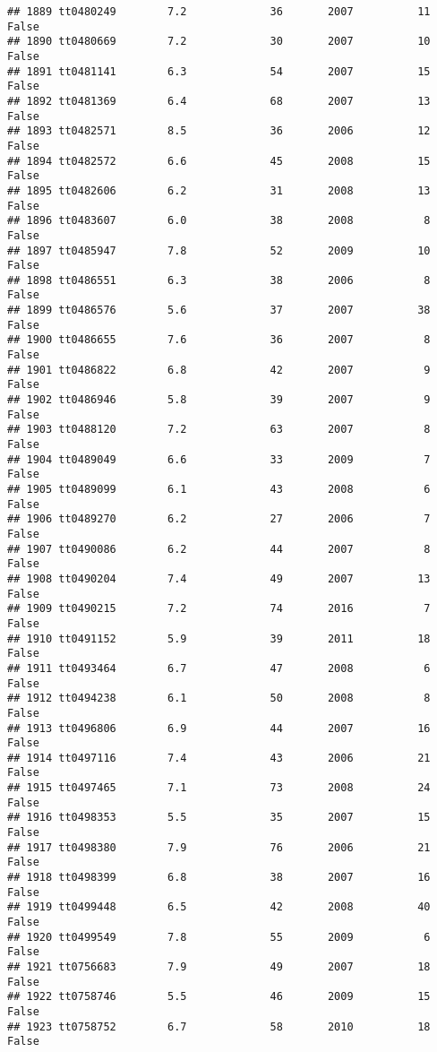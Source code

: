 \documentclass[
]{article}
\begin{document}
\begin{verbatim}
## 1889 tt0480249        7.2             36       2007          11   False
## 1890 tt0480669        7.2             30       2007          10   False
## 1891 tt0481141        6.3             54       2007          15   False
## 1892 tt0481369        6.4             68       2007          13   False
## 1893 tt0482571        8.5             36       2006          12   False
## 1894 tt0482572        6.6             45       2008          15   False
## 1895 tt0482606        6.2             31       2008          13   False
## 1896 tt0483607        6.0             38       2008           8   False
## 1897 tt0485947        7.8             52       2009          10   False
## 1898 tt0486551        6.3             38       2006           8   False
## 1899 tt0486576        5.6             37       2007          38   False
## 1900 tt0486655        7.6             36       2007           8   False
## 1901 tt0486822        6.8             42       2007           9   False
## 1902 tt0486946        5.8             39       2007           9   False
## 1903 tt0488120        7.2             63       2007           8   False
## 1904 tt0489049        6.6             33       2009           7   False
## 1905 tt0489099        6.1             43       2008           6   False
## 1906 tt0489270        6.2             27       2006           7   False
## 1907 tt0490086        6.2             44       2007           8   False
## 1908 tt0490204        7.4             49       2007          13   False
## 1909 tt0490215        7.2             74       2016           7   False
## 1910 tt0491152        5.9             39       2011          18   False
## 1911 tt0493464        6.7             47       2008           6   False
## 1912 tt0494238        6.1             50       2008           8   False
## 1913 tt0496806        6.9             44       2007          16   False
## 1914 tt0497116        7.4             43       2006          21   False
## 1915 tt0497465        7.1             73       2008          24   False
## 1916 tt0498353        5.5             35       2007          15   False
## 1917 tt0498380        7.9             76       2006          21   False
## 1918 tt0498399        6.8             38       2007          16   False
## 1919 tt0499448        6.5             42       2008          40   False
## 1920 tt0499549        7.8             55       2009           6   False
## 1921 tt0756683        7.9             49       2007          18   False
## 1922 tt0758746        5.5             46       2009          15   False
## 1923 tt0758752        6.7             58       2010          18   False

\end{verbatim}
\end{document}
